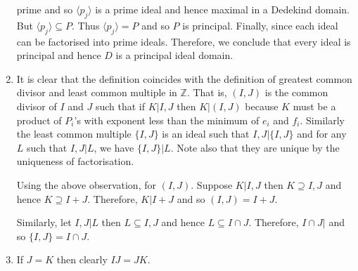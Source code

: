 \begin{enumerate}
     prime and so $\langle p_j \rangle$ is a prime ideal and hence maximal in a Dedekind domain.
    But $\langle p_j \rangle \subseteq P$. Thus $\langle p_j \rangle =P$ and so $P$ is principal. Finally,
     since each ideal can be factorised into prime ideals. Therefore, we conclude that every ideal is principal
    and hence $D$ is a principal ideal domain.
\item It is clear that the definition coincides with the definition of greatest common divisor and least common multiple in $\mathbb{Z}$. That is, $(I,J)$ is the common divisor of $I$ and $J$ such that if
    $K \big| I,J$ then $K\big|(I,J)$ because $K$ must be a product of $P_i$'s with exponent less than the
    minimum of $e_i$ and $f_i$. Similarly the least common multiple $\{I,J\}$ is an ideal such that
    $I,J \big| \{I,J\}$ and for any $L$ such that $I,J \big| L$, we have $\{I,J\} \big| L$. Note also that they
    are unique by the uniqueness of factorisation.

    Using the above observation, for $(I,J)$. Suppose $K \big| I,J$ then $K \supseteq I,J$ and hence
    $K \supseteq I+J$. Therefore, $K \big| I+J$ and so $(I,J)=I+J$.

    Similarly, let $I,J \big| L$ then $L \subseteq I,J$ and hence $L \subseteq I \cap J$. Therefore,
    $I \cap J \big|$ and so $\{I,J\}=I \cap J$.
\item If $J=K$ then clearly $IJ=JK$.


\end{enumerate}
